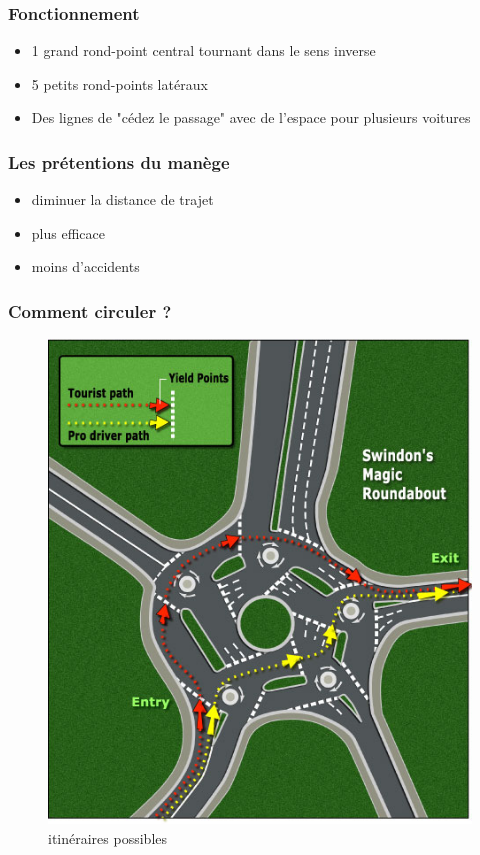 \documentclass[slidetop,11pt]{beamer}
\begin{document}
\begin{frame}
	\frametitle{Fonctionnement}
	\begin{itemize}
		\item 1 grand rond-point central tournant dans le sens inverse
		\item 5 petits rond-points latéraux
		\item Des lignes de "cédez le passage" avec de l'espace pour plusieurs voitures
	\end{itemize}
\end{frame}

\begin{frame}
	\frametitle{Les prétentions du manège}
	\begin{itemize}
		\item diminuer la distance de trajet
		\item plus efficace
		\item moins d'accidents
	\end{itemize}
\end{frame}

\begin{frame}
	\frametitle{Comment circuler ?}
	\begin{figure}
		\begin{center}
			\includegraphics[scale=0.3]{./images/itin}
			\caption{itinéraires possibles}
		\end{center}
	\end{figure}
\end{frame}
\end{document}
